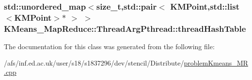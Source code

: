 \hypertarget{classKMeans__MapReduce_1_1ThreadArgPthread_adaad7d178069921452515447c6a39e7d}{
\subsubsection[{thread\-Hash\-Table}]{\setlength{\rightskip}{0pt plus 5cm}std\-::unordered\-\_\-map$<$size\-\_\-t,std\-::pair$<$ {\bf K\-M\-Point},std\-::list$<${\bf K\-M\-Point}$>$$\ast$ $>$ $>$ K\-Means\-\_\-\-Map\-Reduce\-::\-Thread\-Arg\-Pthread\-::thread\-Hash\-Table}}\label{classKMeans__MapReduce_1_1ThreadArgPthread_adaad7d178069921452515447c6a39e7d}


The documentation for this class was generated from the following file\-:\begin{DoxyCompactItemize}
\item 
/afs/inf.\-ed.\-ac.\-uk/user/s18/s1837296/dev/stencil/\-Distribute/\hyperlink{problemKmeans__MR_8cpp}{problem\-Kmeans\-\_\-\-M\-R.\-cpp}\end{DoxyCompactItemize}
